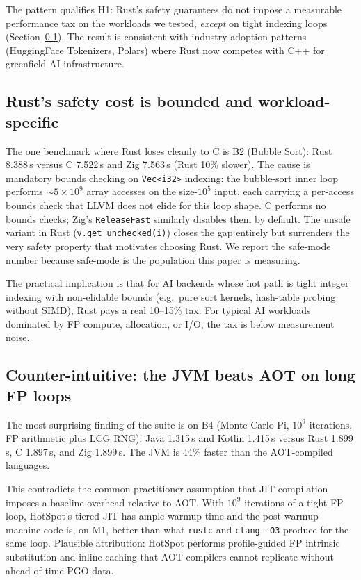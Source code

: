 \documentclass[10pt,conference]{IEEEtran}
\begin{document}
The pattern qualifies H1: Rust's safety guarantees do not impose
a measurable performance tax on the workloads we tested,
\emph{except} on tight indexing loops (Section~\ref{sec:disc-h1}).
The result is consistent with industry adoption patterns
(HuggingFace Tokenizers, Polars) where Rust now competes with C++
for greenfield AI infrastructure.

\subsection{Rust's safety cost is bounded and workload-specific}
\label{sec:disc-h1}

The one benchmark where Rust loses cleanly to C is B2 (Bubble
Sort): Rust 8.388\,s versus C 7.522\,s and Zig 7.563\,s (Rust 10\%
slower). The cause is mandatory bounds checking on
\texttt{Vec}\verb|<i32>| indexing: the bubble-sort inner loop
performs $\sim 5 \times 10^9$ array accesses on the size-$10^5$
input, each carrying a per-access bounds check that LLVM does not
elide for this loop shape. C performs no bounds checks; Zig's
\texttt{ReleaseFast} similarly disables them by default. The
unsafe variant in Rust (\texttt{v.get\_unchecked(i)}) closes the
gap entirely but surrenders the very safety property that
motivates choosing Rust. We report the safe-mode number because
safe-mode is the population this paper is measuring.

The practical implication is that for AI backends whose hot path
is tight integer indexing with non-elidable bounds (e.g.\ pure
sort kernels, hash-table probing without SIMD), Rust pays a
real 10--15\% tax. For typical AI workloads dominated by FP
compute, allocation, or I/O, the tax is below measurement noise.

\subsection{Counter-intuitive: the JVM beats AOT on long FP loops}
\label{sec:disc-jit}

The most surprising finding of the suite is on B4 (Monte Carlo Pi,
$10^9$ iterations, FP arithmetic plus LCG RNG): Java 1.315\,s and
Kotlin 1.415\,s versus Rust 1.899\,s, C 1.897\,s, and Zig
1.899\,s. The JVM is 44\% faster than the AOT-compiled languages.

This contradicts the common practitioner assumption that JIT
compilation imposes a baseline overhead relative to AOT. With
$10^9$ iterations of a tight FP loop, HotSpot's tiered JIT has
ample warmup time and the post-warmup machine code is, on M1,
better than what \texttt{rustc} and \texttt{clang -O3} produce for
the same loop. Plausible attribution: HotSpot performs
profile-guided FP intrinsic substitution and inline caching that
AOT compilers cannot replicate without ahead-of-time PGO data.
\end{document}
